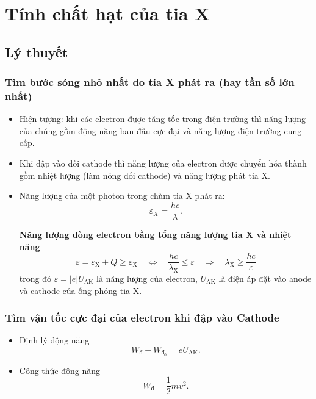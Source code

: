 
\chapter[Tính chất hạt của tia X]{Tính chất hạt của tia X }

\section{Lý thuyết}

\subsection{Tìm bước sóng nhỏ nhất do tia X phát ra (hay tần số lớn nhất)}

\begin{itemize}
	\item Hiện tượng: khi các electron được tăng tốc trong điện trường thì năng lượng của chúng gồm động năng ban đầu cực đại và năng lượng điện trường cung cấp.
	\item Khi đập vào đối cathode thì năng lượng của electron được chuyển hóa thành gồm nhiệt lượng (làm nóng đối cathode) và năng lượng  phát tia X.
	\item Năng lượng của một photon trong chùm tia X phát ra:
	\begin{equation}
		\varepsilon_X =\dfrac{hc}{\lambda}.
	\end{equation}
	
	\textbf{Năng lượng dòng electron bằng tổng năng lượng tia X và nhiệt năng} 
	\begin{equation}
		\varepsilon = \varepsilon_{\text{X}}+ Q \geq \varepsilon_{\text{X}} \quad\Leftrightarrow\quad \dfrac{hc}{\lambda_\text{X}} \leq \varepsilon  \quad\Rightarrow\quad \lambda_{\text{X}} \geq \dfrac{hc}{\varepsilon}
	\end{equation}
	trong đó $\varepsilon = |e|U_{\text{AK}}$ là năng lượng của electron, $U_{\text{AK}}$ là điện áp đặt vào anode và cathode của ống phóng tia X.
\end{itemize}

\subsection{Tìm vận tốc cực đại của electron khi đập vào Cathode}

\begin{itemize}
	\item Định lý động năng
	\begin{equation}
		W_{\text{đ}}- W_{\text{đ}_0} =eU_{\text{AK}}.
	\end{equation}
	\item Công thức động năng
	\begin{equation}
		W_{\text{đ}}=\dfrac{1}{2}mv^2.
	\end{equation}
\end{itemize}


